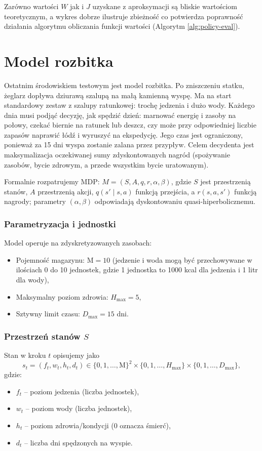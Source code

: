 Zarówno wartości $W$ jak i $J$ uzyskane z aproksymacji są bliskie wartościom teoretycznym, a wykres dobrze ilustruje zbieżność co potwierdza poprawność działania algorytmu obliczania funkcji wartości (Algorytm \ref{alg:policy-eval}).
\newpage
\section{Model rozbitka}


Ostatnim środowiskiem testowym jest model rozbitka. Po zniszczeniu statku, żeglarz dopływa dziurawą szalupą na małą kamienną wyspę. Ma na start standardowy zestaw z szalupy ratunkowej: trochę jedzenia i dużo wody. Każdego dnia musi podjąć decyzję, jak spędzić dzień: marnować energię i zasoby na połowy, czekać biernie na ratunek lub deszcz, czy może przy odpowiedniej liczbie zapasów naprawić łódź i wyruszyć na ekspedycję. Jego czas jest ograniczony, ponieważ za 15 dni wyspa zostanie zalana przez przypływ. Celem decydenta jest maksymalizacja oczekiwanej sumy zdyskontowanych nagród (spożywanie zasobów, bycie zdrowym, a przede wszystkim bycie uratowanym).

Formalnie rozpatrujemy MDP: $M=(S,A,q,r,\alpha,\beta)$, gdzie $S$ jest przestrzenią stanów, $A$ przestrzenią akcji, $q(s'\mid s,a)$ funkcją przejścia, a $r(s,a,s')$ funkcją nagrody; parametry $(\alpha,\beta)$ odpowiadają dyskontowaniu quasi-hiperbolicznemu.

\subsubsection{Parametryzacja i jednostki}

Model operuje na zdyskretyzowanych zasobach:
\begin{itemize}
    \item Pojemność magazynu: $\mathrm{M} = 10$ (jedzenie i woda mogą być przechowywane w ilościach 0 do 10 jednostek, gdzie 1 jednostka to 1000 kcal dla jedzenia i 1 litr dla wody),
    \item Maksymalny poziom zdrowia: $H_{\max} = 5$,
    \item Sztywny limit czasu: $D_{\max} = 15$ dni.
\end{itemize}

\subsubsection{Przestrzeń stanów $S$}

Stan w kroku $t$ opisujemy jako
\[
s_t=(f_t,w_t,h_t,d_t)\in\{0,1,\dots,\mathrm{M}\}^2\times\{0,1,\dots,H_{\max}\}\times\{0,1,\dots,D_{\max}\},
\]
gdzie:
\begin{itemize}
    \item $f_t$ -- poziom jedzenia (liczba jednostek),
    \item $w_t$ -- poziom wody (liczba jednostek),
    \item $h_t$ -- poziom zdrowia/kondycji (0 oznacza śmierć),
    \item $d_t$ -- liczba dni spędzonych na wyspie.
\end{itemize}


